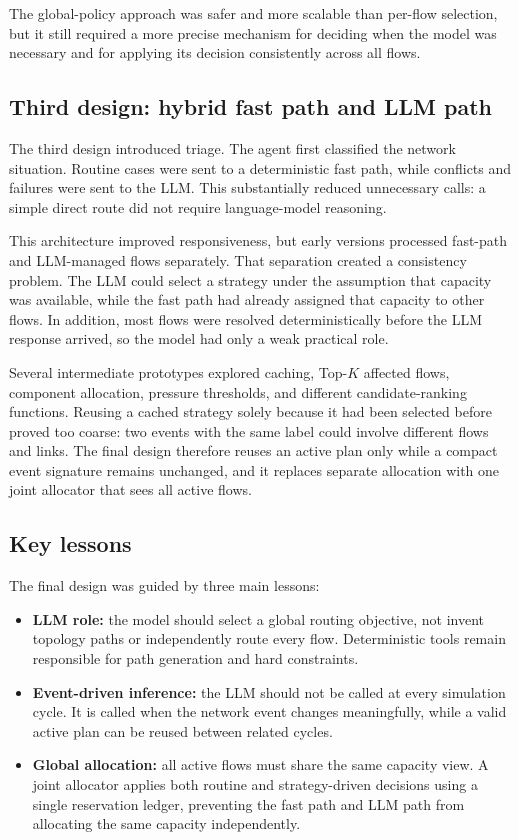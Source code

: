 The global-policy approach was safer and more scalable than per-flow selection, but it
still required a more precise mechanism for deciding when the model was necessary and
for applying its decision consistently across all flows.

\subsection{Third design: hybrid fast path and LLM path}

The third design introduced triage. The agent first classified the network situation.
Routine cases were sent to a deterministic fast path, while conflicts and failures
were sent to the LLM. This substantially reduced unnecessary calls: a simple direct
route did not require language-model reasoning.

This architecture improved responsiveness, but early versions processed fast-path and
LLM-managed flows separately. That separation created a consistency problem. The LLM
could select a strategy under the assumption that capacity was available, while the
fast path had already assigned that capacity to other flows. In addition, most flows
were resolved deterministically before the LLM response arrived, so the model had only
a weak practical role.

Several intermediate prototypes explored caching, Top-$K$ affected flows, component
allocation, pressure thresholds, and different candidate-ranking functions. Reusing a
cached strategy solely because it had been selected before proved too coarse: two
events with the same label could involve different flows and links. The final design
therefore reuses an active plan only while a compact event signature remains unchanged,
and it replaces separate allocation with one joint allocator that sees all active
flows.

\subsection{Key lessons}

The final design was guided by three main lessons:

\begin{itemize}
    \item \textbf{LLM role:} the model should select a global routing objective, not
    invent topology paths or independently route every flow. Deterministic tools remain
    responsible for path generation and hard constraints.

    \item \textbf{Event-driven inference:} the LLM should not be called at every
    simulation cycle. It is called when the network event changes meaningfully, while
    a valid active plan can be reused between related cycles.

    \item \textbf{Global allocation:} all active flows must share the same capacity
    view. A joint allocator applies both routine and strategy-driven decisions using a
    single reservation ledger, preventing the fast path and LLM path from allocating
    the same capacity independently.
\end{itemize}


